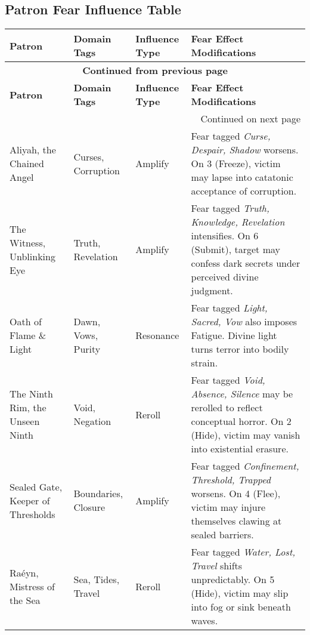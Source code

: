 \subsection{Patron Fear Influence Table}
\label{subsec:patron-fear-table}
\begin{longtable}{@{}p{3.2cm}p{4.5cm}p{2.8cm}p{5.9cm}@{}}
\toprule
\textbf{Patron} & \textbf{Domain Tags} & \textbf{Influence Type} & \textbf{Fear Effect Modifications} \\
\midrule
\endfirsthead

\multicolumn{4}{c}{{\bfseries Continued from previous page}} \\
\toprule
\textbf{Patron} & \textbf{Domain Tags} & \textbf{Influence Type} & \textbf{Fear Effect Modifications} \\
\midrule
\endhead

\midrule
\multicolumn{4}{r}{{Continued on next page}} \\
\endfoot

\bottomrule
\endlastfoot

Aliyah, the Chained Angel & Curses, Corruption & Amplify & 
Fear tagged \emph{Curse, Despair, Shadow} worsens. On 3 (Freeze), victim may lapse into catatonic acceptance of corruption. \\

The Witness, Unblinking Eye & Truth, Revelation & Amplify & 
Fear tagged \emph{Truth, Knowledge, Revelation} intensifies. On 6 (Submit), target may confess dark secrets under perceived divine judgment. \\

Oath of Flame \& Light & Dawn, Vows, Purity & Resonance & 
Fear tagged \emph{Light, Sacred, Vow} also imposes Fatigue. Divine light turns terror into bodily strain. \\

The Ninth Rim, the Unseen Ninth & Void, Negation & Reroll & 
Fear tagged \emph{Void, Absence, Silence} may be rerolled to reflect conceptual horror. On 2 (Hide), victim may vanish into existential erasure. \\

Sealed Gate, Keeper of Thresholds & Boundaries, Closure & Amplify & 
Fear tagged \emph{Confinement, Threshold, Trapped} worsens. On 4 (Flee), victim may injure themselves clawing at sealed barriers. \\

Raéyn, Mistress of the Sea & Sea, Tides, Travel & Reroll & 
Fear tagged \emph{Water, Lost, Travel} shifts unpredictably. On 5 (Hide), victim may slip into fog or sink beneath waves. \\


\end{longtable}

